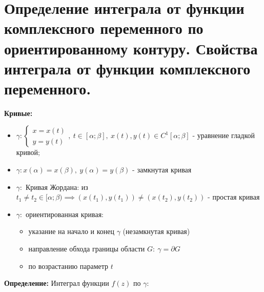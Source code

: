 \section{Определение интеграла от функции комплексного переменного по
ориентированному контуру. Свойства интеграла от функции комплексного
переменного.}\label{ux43eux43fux440ux435ux434ux435ux43bux435ux43dux438ux435-ux438ux43dux442ux435ux433ux440ux430ux43bux430-ux43eux442-ux444ux443ux43dux43aux446ux438ux438-ux43aux43eux43cux43fux43bux435ux43aux441ux43dux43eux433ux43e-ux43fux435ux440ux435ux43cux435ux43dux43dux43eux433ux43e-ux43fux43e-ux43eux440ux438ux435ux43dux442ux438ux440ux43eux432ux430ux43dux43dux43eux43cux443-ux43aux43eux43dux442ux443ux440ux443.-ux441ux432ux43eux439ux441ux442ux432ux430-ux438ux43dux442ux435ux433ux440ux430ux43bux430-ux43eux442-ux444ux443ux43dux43aux446ux438ux438-ux43aux43eux43cux43fux43bux435ux43aux441ux43dux43eux433ux43e-ux43fux435ux440ux435ux43cux435ux43dux43dux43eux433ux43e.}

\textbf{Кривые:}

\begin{itemize}
\tightlist
\item
  \(\gamma:\begin{cases}x=x(t) \\ y=y(t)\end{cases}, \ t\in[\alpha;\beta], \ x(t),y(t)\in C^{1}[\alpha;\beta]\)
  - уравнение гладкой кривой;
\item
  \(\gamma:x(\alpha)=x(\beta), \ y(\alpha)=y(\beta)\) - замкнутая кривая
\item
  \(\gamma:\) Кривая Жордана: из
  \(t_{1}\neq t_{2}\in[\alpha;\beta)\implies(x(t_{1}),y(t_{1}))\neq(x(t_{2}),y(t_{2}))\)
  - простая кривая
\item
  \(\gamma:\) ориентированная кривая:

  \begin{itemize}
  \tightlist
  \item
    указание на начало и конец \(\gamma\) (незамкнутая кривая)
  \item
    направление обхода границы области \(G: \ \gamma=\partial G\)
  \item
    по возрастанию параметр \(t\)
  \end{itemize}
\end{itemize}

\textbf{Определение:} Интеграл функции \(f(z)\) по \(\gamma:\)

